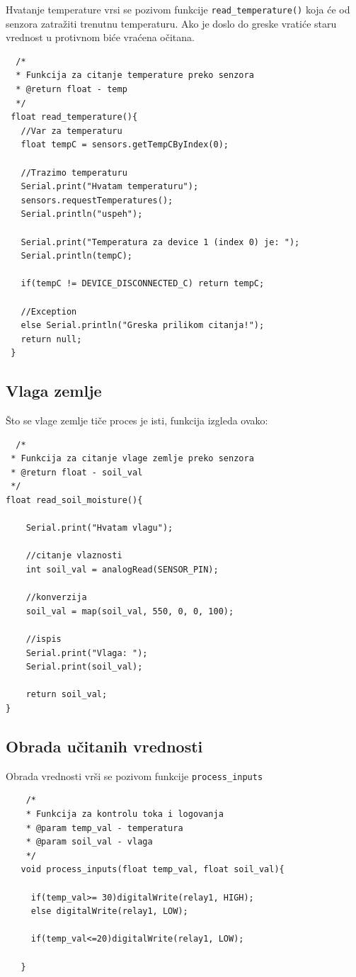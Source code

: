 \documentclass[a4paper,11pt]{book}
\begin{document}
Hvatanje temperature vrsi se pozivom funkcije \verb|read_temperature()| koja će od senzora zatražiti trenutnu temperaturu. Ako je doslo do greske vratiće staru vrednost u protivnom biće vraćena očitana. 

\begin{lstlisting}
  /*
  * Funkcija za citanje temperature preko senzora
  * @return float - temp
  */
 float read_temperature(){
   //Var za temperaturu
   float tempC = sensors.getTempCByIndex(0);
   
   //Trazimo temperaturu
   Serial.print("Hvatam temperaturu");
   sensors.requestTemperatures();
   Serial.println("uspeh");
 
   Serial.print("Temperatura za device 1 (index 0) je: ");
   Serial.println(tempC);
 
   if(tempC != DEVICE_DISCONNECTED_C) return tempC;
 
   //Exception
   else Serial.println("Greska prilikom citanja!");
   return null;
 }
\end{lstlisting}
  
\subsection{Vlaga zemlje}

Što se vlage zemlje tiče proces je isti, funkcija izgleda ovako:

\begin{lstlisting}
  /*
 * Funkcija za citanje vlage zemlje preko senzora
 * @return float - soil_val
 */
float read_soil_moisture(){

	Serial.print("Hvatam vlagu");

	//citanje vlaznosti
	int soil_val = analogRead(SENSOR_PIN);

	//konverzija
	soil_val = map(soil_val, 550, 0, 0, 100);

	//ispis
	Serial.print("Vlaga: ");
	Serial.print(soil_val);

	return soil_val;
}
  \end{lstlisting}

  \subsection{Obrada učitanih vrednosti}

  Obrada vrednosti vrši se pozivom funkcije \verb|process_inputs|

  \begin{lstlisting}
    /*
    * Funkcija za kontrolu toka i logovanja
    * @param temp_val - temperatura
    * @param soil_val - vlaga
    */
   void process_inputs(float temp_val, float soil_val){
   
     if(temp_val>= 30)digitalWrite(relay1, HIGH);
     else digitalWrite(relay1, LOW);
   
     if(temp_val<=20)digitalWrite(relay1, LOW);
   
   }
    \end{lstlisting}
\end{document}
